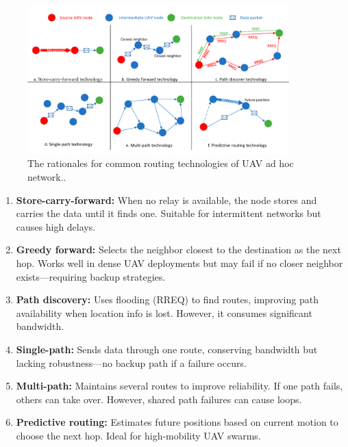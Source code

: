 \begin{figure}[ht]
\centering
\includegraphics[width=0.9\textwidth]{Figures/Chapter1/Section6/1.png}
\caption{The rationales for common routing technologies of UAV ad hoc network.\cite{Chen2020}.}
\label{fig:The rationales for common routing technologies of UAV ad hoc network.}
\end{figure}



\begin{enumerate}
    \item \textbf{Store-carry-forward:} When no relay is available, the node stores and carries the data until it finds one. Suitable for intermittent networks but causes high delays.

    \item \textbf{Greedy forward:} Selects the neighbor closest to the destination as the next hop. Works well in dense UAV deployments but may fail if no closer neighbor exists—requiring backup strategies.

    \item \textbf{Path discovery:} Uses flooding (RREQ) to find routes, improving path availability when location info is lost. However, it consumes significant bandwidth.

    \item \textbf{Single-path:} Sends data through one route, conserving bandwidth but lacking robustness—no backup path if a failure occurs.

    \item \textbf{Multi-path:} Maintains several routes to improve reliability. If one path fails, others can take over. However, shared path failures can cause loops.

    \item \textbf{Predictive routing:} Estimates future positions based on current motion to choose the next hop. Ideal for high-mobility UAV swarms.
\end{enumerate}



